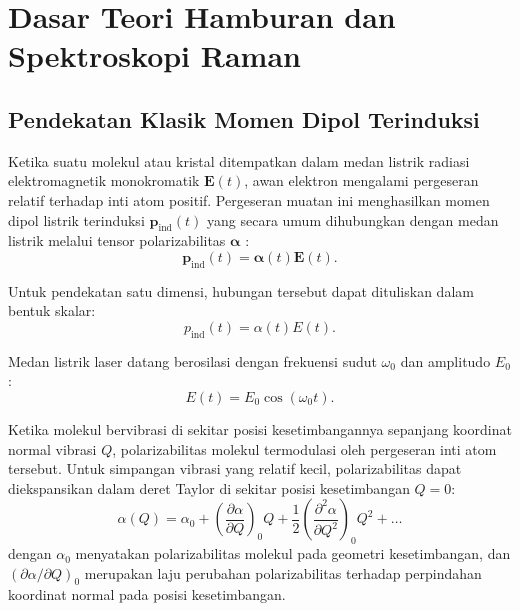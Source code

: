 \section{Dasar Teori Hamburan dan Spektroskopi Raman}
\label{sec:dasar_raman}

\subsection{Pendekatan Klasik Momen Dipol Terinduksi}
Ketika suatu molekul atau kristal ditempatkan dalam medan listrik radiasi elektromagnetik monokromatik $\mathbf{E}(t)$, awan elektron mengalami pergeseran relatif terhadap inti atom positif. Pergeseran muatan ini menghasilkan momen dipol listrik terinduksi $\mathbf{p}_{\mathrm{ind}}(t)$ yang secara umum dihubungkan dengan medan listrik melalui tensor polarizabilitas $\boldsymbol{\alpha}$ \cite{long2002raman}:
\begin{equation}
\mathbf{p}_{\mathrm{ind}}(t) = \boldsymbol{\alpha}(t) \mathbf{E}(t).
\label{eq:dipol_tensor}
\end{equation}

Untuk pendekatan satu dimensi, hubungan tersebut dapat dituliskan dalam bentuk skalar:
\begin{equation}
p_{\mathrm{ind}}(t) = \alpha(t) E(t).
\label{eq:dipol_skalar}
\end{equation}

Medan listrik laser datang berosilasi dengan frekuensi sudut $\omega_0$ dan amplitudo $E_0$:
\begin{equation}
E(t) = E_0 \cos(\omega_0 t).
\label{eq:medan_laser}
\end{equation}

Ketika molekul bervibrasi di sekitar posisi kesetimbangannya sepanjang koordinat normal vibrasi $Q$, polarizabilitas molekul termodulasi oleh pergeseran inti atom tersebut. Untuk simpangan vibrasi yang relatif kecil, polarizabilitas dapat diekspansikan dalam deret Taylor di sekitar posisi kesetimbangan $Q = 0$:
\begin{equation}
\alpha(Q) = \alpha_0 + \left(\frac{\partial \alpha}{\partial Q}\right)_0 Q + \frac{1}{2}\left(\frac{\partial^2 \alpha}{\partial Q^2}\right)_0 Q^2 + \dots
\label{eq:taylor_polarizabilitas}
\end{equation}
dengan $\alpha_0$ menyatakan polarizabilitas molekul pada geometri kesetimbangan, dan $(\partial \alpha/\partial Q)_0$ merupakan laju perubahan polarizabilitas terhadap perpindahan koordinat normal pada posisi kesetimbangan.

